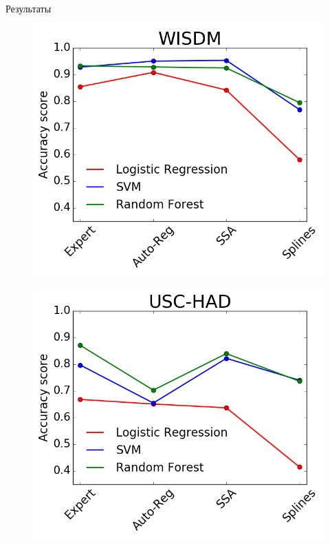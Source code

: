 \documentclass{beamer}
\begin{document}
\begin{frame}{Результаты}
	\begin{minipage}[t]{0.49\columnwidth}
		\begin{figure}[h]
			\centering
			\includegraphics[width=1.05\linewidth]{wisdm_methods.png}
		\end{figure}
	\end{minipage}
	\hfill
	\begin{minipage}[t]{0.49\columnwidth}
		\begin{figure}[h]
			\centering
			\includegraphics[width=1.05\linewidth]{uschad_methods.png}

\end{figure}
\end{minipage}
\end{frame}
\end{document}
